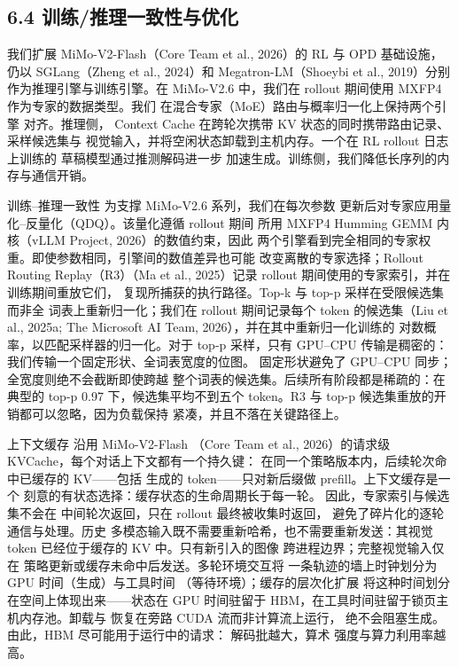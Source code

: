 \subsection{6.4 训练/推理一致性与优化}\label{traininginference-consistency-and-optimization}

我们扩展 MiMo-V2-Flash（Core Team et
al., 2026）的 RL 与 OPD 基础设施，仍以 SGLang（Zheng et al., 2024）和 Megatron-LM（Shoeybi
et al., 2019）分别作为推理引擎与训练引擎。在
MiMo-V2.6 中，我们在 rollout 期间使用 MXFP4 作为专家的数据类型。我们
在混合专家（MoE）路由与概率归一化上保持两个引擎
对齐。推理侧，
Context Cache 在跨轮次携带 KV 状态的同时携带路由记录、采样候选集与
视觉输入，并将空闲状态卸载到主机内存。一个在 RL rollout 日志上训练的
草稿模型通过推测解码进一步
加速生成。训练侧，我们降低长序列的内存与通信开销。

训练--推理一致性 为支撑 MiMo-V2.6 系列，我们在每次参数
更新后对专家应用量化--反量化（QDQ）。该量化遵循 rollout 期间
所用 MXFP4 Humming GEMM 内核（vLLM Project, 2026）的数值约束，因此
两个引擎看到完全相同的专家权重。即使参数相同，引擎间的数值差异也可能
改变离散的专家选择；Rollout Routing Replay（R3）（Ma et al., 2025）记录
rollout 期间使用的专家索引，并在训练期间重放它们，
复现所捕获的执行路径。Top-k 与 top-p 采样在受限候选集而非全
词表上重新归一化；我们在 rollout 期间记录每个 token 的候选集（Liu et
al., 2025a; The Microsoft AI Team, 2026），并在其中重新归一化训练的
对数概率，以匹配采样器的归一化。对于
top-p 采样，只有 GPU--CPU 传输是稠密的：我们传输一个固定形状、全词表宽度的位图。
固定形状避免了 GPU--CPU
同步；全宽度则绝不会截断即使跨越
整个词表的候选集。后续所有阶段都是稀疏的：在典型的 top-p
0.97 下，候选集平均不到五个 token。R3 与 top-p
候选集重放的开销都可以忽略，因为负载保持
紧凑，并且不落在关键路径上。

上下文缓存 沿用 MiMo-V2-Flash
（Core Team et al., 2026）的请求级 KVCache，每个对话上下文都有一个持久键：
在同一个策略版本内，后续轮次命中已缓存的 KV——包括
生成的 token——只对新后缀做 prefill。上下文缓存是一个
刻意的有状态选择：缓存状态的生命周期长于每一轮。
因此，专家索引与候选集不会在
中间轮次返回，只在 rollout 最终被收集时返回，
避免了碎片化的逐轮通信与处理。历史
多模态输入既不需要重新哈希，也不需要重新发送：其视觉
token 已经位于缓存的 KV 中。只有新引入的图像
跨进程边界；完整视觉输入仅在
策略更新或缓存未命中后发送。多轮环境交互将
一条轨迹的墙上时钟划分为 GPU 时间（生成）与工具时间
（等待环境）；缓存的层次化扩展
将这种时间划分在空间上体现出来——状态在
GPU 时间驻留于 HBM，在工具时间驻留于锁页主机内存池。卸载与
恢复在旁路 CUDA 流而非计算流上运行，
绝不会阻塞生成。由此，HBM 尽可能用于运行中的请求：
解码批越大，算术
强度与算力利用率越高。

